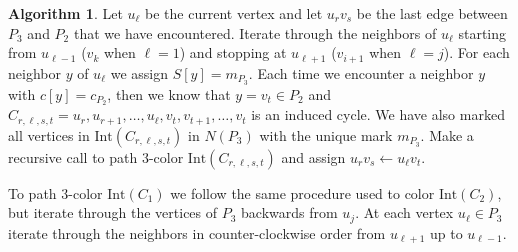 \documentclass[12pt,letterpaper]{article}
\theoremstyle{plain}
\theoremstyle{definition}
\theoremstyle{break}
\newtheorem{algorithm}[lemma]{Algorithm}     %
\begin{document}
\begin{algorithm}
Let $u_\ell$ be the current vertex and let $u_rv_s$ be the last edge
between $P_3$ and $P_2$ that we have encountered. Iterate through the neighbors of $u_\ell$
starting from $u_{\ell-1}$ ($v_k$ when $\ell=1$) and stopping at $u_{\ell+1}$
($v_{i+1}$ when $\ell=j$). For each neighbor $y$ of $u_\ell$ we assign
$S[y]=m_{P_3}$. Each time we encounter a neighbor $y$ with
$c[y]=c_{P_2}$, then we know that $y=v_t\in P_2$ and
$C_{r,\ell,s,t}=u_r,u_{r+1},\ldots,u_\ell,v_t,v_{t+1},\ldots,v_t$ is an induced cycle. We
have also marked all vertices in $\text{Int}(C_{r,\ell,s,t})$ in $N(P_3)$
with the unique mark $m_{P_3}$. Make a recursive call to path $3$-color
$\text{Int}(C_{r,\ell,s,t})$ and assign $u_rv_s\leftarrow u_\ell v_t$.

To path $3$-color $\text{Int}(C_1)$ we follow the same procedure used
to color $\text{Int}(C_2)$, but iterate through the vertices of $P_3$
backwards from $u_j$. At each
vertex $u_\ell\in P_3$ iterate through the neighbors in
counter-clockwise order from $u_{\ell+1}$ up to $u_{\ell - 1}$.
\end{algorithm}
\end{document}
